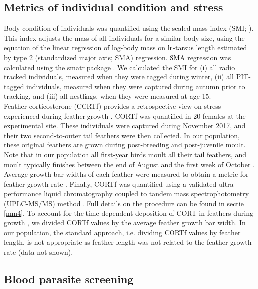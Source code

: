 \documentclass[10pt, twoside]{book} %
\begin{document}
	
	
	\subsection*{Metrics of individual condition and stress}
	
Body condition of individuals was quantified using the scaled-mass index (SMI; \citealt{Peig2009}). This index adjusts the mass of all individuals for a similar body size, using the equation of the linear regression of log-body mass on ln-tarsus length estimated by type 2 (standardized major axis; SMA) regression. SMA regression was calculated using the smatr package \citep{Warton2012}. We calculated the SMI for (i) all radio tracked individuals, measured when they were tagged during winter, (ii) all PIT-tagged individuals, measured when they were captured during autumn prior to tracking, and (iii) all nestlings, when they were measured at age 15.\\

Feather corticosterone (CORTf) provides a retrospective view on stress experienced during feather growth \citep{Bortolotti2008, Johns2018}. CORTf was quantified in 20 females at the experimental site. These individuals were captured during November 2017, and their two second-to-outer tail feathers were then collected. In our population, these original feathers are grown during post-breeding and post-juvenile moult. Note that in our population all first-year birds moult all their tail feathers, and moult typically finishes between the end of August and the first week of October \citep{Dhondt1973}. Average growth bar widths of each feather were measured to obtain a metric for feather growth rate \citep{Brodin1993, Grubb2006}. Finally, CORTf was quantified using a validated ultra-performance liquid chromatography coupled to tandem mass spectrophotometry (UPLC-MS/MS) method \citep{SallehHudin2018}. Full details on the procedure can be found in sectie \ref{mm4}. To account for the time-dependent deposition of CORT in feathers during growth \citep{Romero2016}, we divided CORTf values by the average feather growth bar width. In our population, the standard approach, i.e. dividing CORTf values by feather length, is not appropriate as feather length was not related to the feather growth rate (data not shown).
	

	\subsection*{Blood parasite screening}
	
\end{document}
